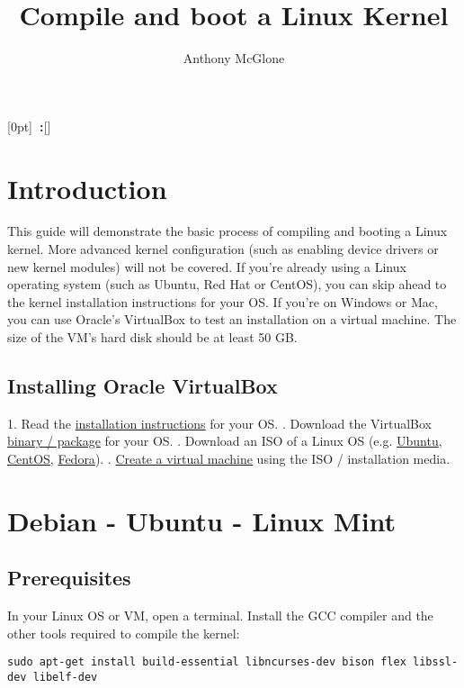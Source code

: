 \documentclass[12pt,a4paper]{report}
\author{Anthony McGlone}\title{Compile and boot a Linux Kernel}
\newcommand{\setupname}[1][\chaptername]{
\titlecontents{chapter}[0pt]{\vspace{1ex}}{\bfseries#1~\thecontentslabel:\quad}{\bfseries}{\bfseries\hfill\contentspage}[]
}
\begin{document}
\maketitle

\tableofcontents

\setupname
\chapter{Introduction}

This guide will demonstrate the basic process of compiling and booting a Linux kernel. More advanced kernel configuration (such as enabling device drivers or new kernel modules) will not be covered. 
\newline
\newline
If you're already using a Linux operating system (such as Ubuntu, Red Hat or CentOS), you can skip ahead to the kernel installation instructions for your OS. 
\newline
\newline
If you're on Windows or Mac, you can use Oracle's VirtualBox to test an installation on a virtual machine. The size of the VM's hard disk should be at least 50 GB.

\section{Installing Oracle VirtualBox}

1. Read the \href{https://www.virtualbox.org/manual/ch02.html}{installation instructions} for your OS.
. Download the VirtualBox \href{https://www.virtualbox.org/wiki/Downloads}{binary / package} for your OS.
. Download an ISO of a Linux OS (e.g. \href{https://ubuntu.com/download/desktop}{Ubuntu}, \href{https://www.centos.org/download/}{CentOS}, \href{https://getfedora.org/workstation/download/}{Fedora}).
. \href{https://docs.oracle.com/cd/E26217_01/E26796/html/qs-create-vm.html}{Create a virtual machine} using the ISO / installation media.



\chapter{Debian - Ubuntu - Linux Mint}

\section{Prerequisites}
In your Linux OS or VM, open a terminal. Install the GCC compiler and the other tools required to compile the kernel:
\newline
\newline
\centerline{\texttt{\scriptsize sudo apt-get install build-essential libncurses-dev bison flex libssl-dev libelf-dev}}
\end{document}

